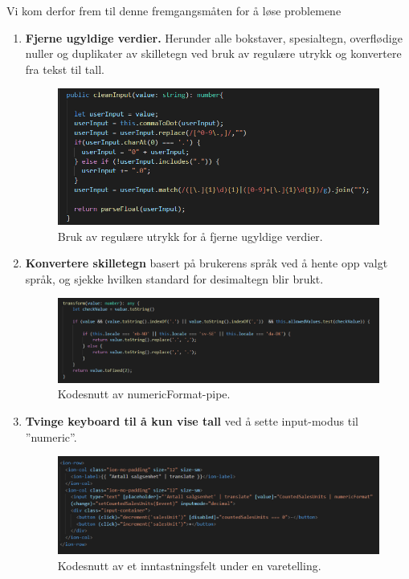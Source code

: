 Vi kom derfor frem til denne fremgangsmåten for å løse problemene

\begin{enumerate}
    \item \textbf{Fjerne ugyldige verdier.} Herunder alle bokstaver, spesialtegn, overflødige nuller og duplikater av skilletegn ved bruk av regulære utrykk og konvertere fra tekst til tall.
    
    \begin{figure}[H] 
        \centering
        \includegraphics[width=120mm]{figures/Utfordringer/cleanInput.PNG}
        \caption{Bruk av regulære utrykk for å fjerne ugyldige verdier.}
    \end{figure}
    
    \item \textbf{Konvertere skilletegn} basert på brukerens språk ved å hente opp valgt språk, og sjekke hvilken standard for desimaltegn blir brukt.
    
    \begin{figure}[H] 
        \centering
        \includegraphics[width=120mm]{figures/Utfordringer/numericFormat.PNG}
        \caption{Kodesnutt av numericFormat-pipe.}
    \end{figure}
    
    \item \textbf{Tvinge keyboard til å kun vise tall} ved å sette input-modus til ''numeric''.
    
    \begin{figure}[H] 
        \centering
        \includegraphics[width=120mm]{figures/Utfordringer/stock-taking-count-codeSnippet.PNG}
        \caption{Kodesnutt av et inntastningsfelt under en varetelling.}
    \end{figure}
    
\end{enumerate}


